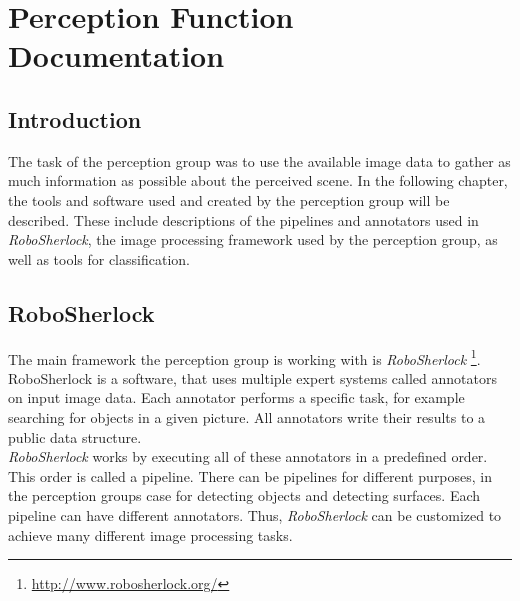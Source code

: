 \documentclass[main.tex]{subfiles}
\begin{document}
\begingroup

\renewcommand{\cleardoublepage}{}

\renewcommand{\clearpage}{}
\newpage
\chapter{Perception Function Documentation}

\section{Introduction}
The task of the perception group was to use the available image data to gather as much information as possible about the perceived scene. In the following chapter, the tools and software used and created by the perception group will be described. These include descriptions of the pipelines and annotators used in \textit{RoboSherlock}, the image processing framework used by the perception group, as well as tools for classification.

\section{RoboSherlock}
The main framework the perception group is working with is \textit{RoboSherlock} \footnote{\url{http://www.robosherlock.org/}}. RoboSherlock is a software, that uses multiple expert systems called annotators on input image data. Each annotator performs a specific task, for example searching for objects in a given picture. All annotators write their results to a public data structure.\\
        
\textit{RoboSherlock} works by executing all of these annotators in a predefined order. This order is called a pipeline. There can be pipelines for different purposes, in the perception groups case for detecting objects and detecting surfaces. Each pipeline can have different annotators. Thus, \textit{RoboSherlock} can be customized to achieve many different image processing tasks.
\end{document}
